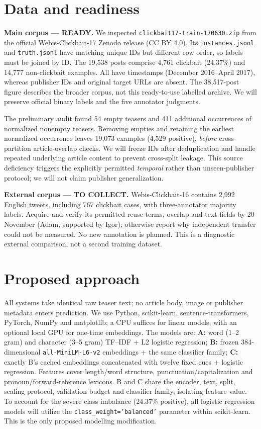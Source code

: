 \documentclass[11pt]{article}
\begin{document}
\section{Data and readiness}
\textbf{Main corpus --- READY.} We inspected \texttt{clickbait17-train-170630.zip} from the official Webis-Clickbait-17 Zenodo release (CC BY 4.0). Its \texttt{instances.jsonl} and \texttt{truth.jsonl} have matching unique IDs but different row order, so labels must be joined by ID. The 19,538 posts comprise 4,761 clickbait (24.37\%) and 14,777 non-clickbait examples. All have timestamps (December 2016--April 2017), whereas publisher IDs and original target URLs are absent. The 38,517-post figure describes the broader corpus, not this ready-to-use labelled archive. We will preserve official binary labels and the five annotator judgments.

The preliminary audit found 54 empty teasers and 411 additional occurrences of normalized nonempty teasers. Removing empties and retaining the earliest normalized occurrence leaves 19,073 examples (4,529 positive), \emph{before} cross-partition article-overlap checks. We will freeze IDs after deduplication and handle repeated underlying article content to prevent cross-split leakage. This source deficiency triggers the explicitly permitted \emph{temporal} rather than unseen-publisher protocol; we will not claim publisher generalization.

\textbf{External corpus --- TO COLLECT.} Webis-Clickbait-16 contains 2,992 English tweets, including 767 clickbait cases, with three-annotator majority labels. Acquire and verify its permitted reuse terms, overlap and text fields by 20 November (Adam, supported by Igor); otherwise report why independent transfer could not be measured. No new annotation is planned. This is a diagnostic external comparison, not a second training dataset.

\section{Proposed approach}
All systems take identical raw teaser text; no article body, image or publisher metadata enters prediction. We use Python, scikit-learn, sentence-transformers, PyTorch, NumPy and matplotlib; a CPU suffices for linear models, with an optional local GPU for one-time embeddings. The models are:
\textbf{A:} word (1--2 gram) and character (3--5 gram) TF--IDF + L2 logistic regression;
\textbf{B:} frozen 384-dimensional \texttt{all-MiniLM-L6-v2} embeddings + the same classifier family;
\textbf{C:} exactly B's cached embeddings concatenated with twelve fixed cues + logistic regression. Features cover length/word structure, punctuation/capitalization and pronoun/forward-reference lexicons. B and C share the encoder, text, split, scaling protocol, validation budget and classifier family, isolating feature value. To account for the severe class imbalance (24.37\% positive), all logistic regression models will utilize the \texttt{class\_weight='balanced'} parameter within scikit-learn. This is the only proposed modelling modification.
\end{document}
